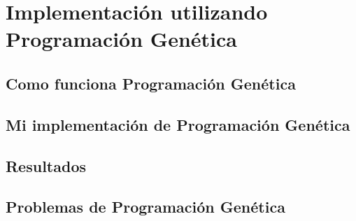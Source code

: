 \section{Implementación utilizando Programación Genética}

\subsection{Como funciona Programación Genética}

\subsection{Mi implementación de Programación Genética}

\subsection{Resultados}

\subsection{Problemas de Programación Genética}
